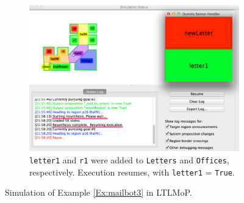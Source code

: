 \begin{figure}[h]
	\begin{subfigure}[b]{0.99\columnwidth}
	\includegraphics[width=0.99\columnwidth, clip]{./img/sim3.jpg}
	\caption{\texttt{letter1} and \texttt{r1} were added to \texttt{Letters} and \texttt{Offices}, respectively. Execution resumes, with \texttt{letter1} = \texttt{True}.} 
	\label{Fig:sim3}
	\end{subfigure}
	\caption{Simulation of Example \ref{Ex:mailbot3} in LTLMoP.}\label{Fig:sim}
\end{figure}

